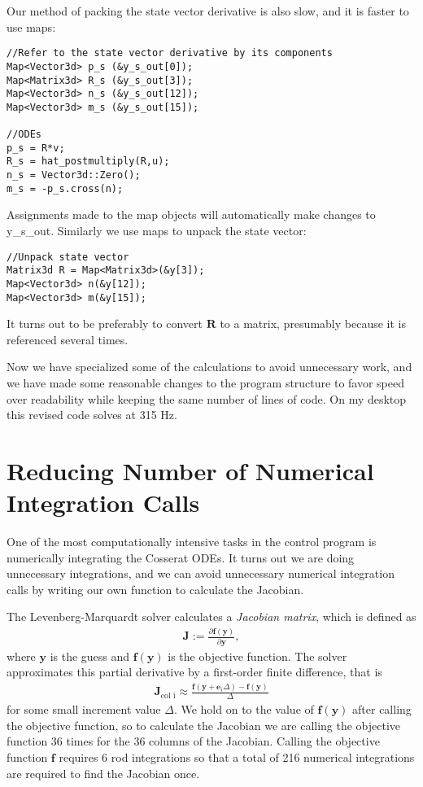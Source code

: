 \documentclass[12pt]{article}
\begin{document}
\newpage
\noindent Our method of packing the state vector derivative is also slow, and it is faster to use maps:
\begin{lstlisting}
//Refer to the state vector derivative by its components
Map<Vector3d> p_s (&y_s_out[0]);
Map<Matrix3d> R_s (&y_s_out[3]);
Map<Vector3d> n_s (&y_s_out[12]);
Map<Vector3d> m_s (&y_s_out[15]);

//ODEs
p_s = R*v;
R_s = hat_postmultiply(R,u);
n_s = Vector3d::Zero();
m_s = -p_s.cross(n);
\end{lstlisting}
Assignments made to the map objects will automatically make changes to y\_s\_out. Similarly we use maps to unpack the state vector:
\begin{lstlisting}
//Unpack state vector
Matrix3d R = Map<Matrix3d>(&y[3]);
Map<Vector3d> n(&y[12]);
Map<Vector3d> m(&y[15]);
\end{lstlisting}
It turns out to be preferably to convert $\boldsymbol{R}$ to a matrix, presumably because it is referenced several times.

Now we have specialized some of the calculations to avoid unnecessary work, and we have made some reasonable changes to the program structure to favor speed over readability while keeping the same number of lines of code. On my desktop this revised code solves at 315 Hz.

\section{Reducing Number of Numerical Integration Calls}

One of the most computationally intensive tasks in the control program is numerically integrating the Cosserat ODEs. It turns out we are doing unnecessary integrations, and we can avoid unnecessary numerical integration calls by writing our own function to calculate the Jacobian.

The Levenberg-Marquardt solver calculates a \emph{Jacobian matrix}, which is defined as
\begin{align*}
\boldsymbol{J} := \frac{\partial \boldsymbol{f}(\boldsymbol{y})}{\partial \boldsymbol{y}},
\end{align*}
where $\boldsymbol{y}$ is the guess and $\boldsymbol{f}(\boldsymbol{y})$ is the objective function. The solver approximates this partial derivative by a first-order finite difference, that is
\begin{align*}
\boldsymbol{J}_\text{col i} \approx \frac{\boldsymbol{f}(\boldsymbol{y} + \boldsymbol{e}_i \Delta) - \boldsymbol{f}(\boldsymbol{y})}{\Delta}
\end{align*}
for some small increment value $\Delta$. We hold on to the value of $\boldsymbol{f}(\boldsymbol{y})$ after calling the objective function, so to calculate the Jacobian we are calling the objective function 36 times for the 36 columns of the Jacobian. Calling the objective function $\boldsymbol{f}$ requires 6 rod integrations so that a total of 216 numerical integrations are required to find the Jacobian once.
\end{document}
